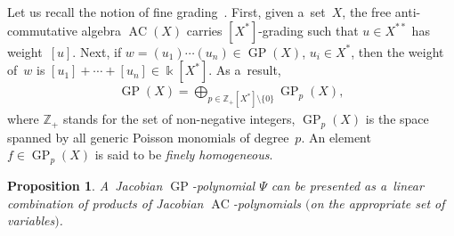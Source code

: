 \documentclass[11pt]{article}
\newtheorem{proposition}{Proposition}
\begin{document}
Let us recall the notion of f\/ine grading~\cite{FarkasI}.
First, given a~set~$X$, the free anti-commutative algebra $\operatorname{AC}(X)$ carries $[X^*]$-grading such that $u\in X^{**}$ has weight~$[u]$.
Next, if $w = (u_1)\cdots (u_n)\in \operatorname{GP}(X)$, $u_i\in X^{*}$, then the weight of~$w$ is $[u_1]+\cdots + [u_n]\in \Bbbk [X^*]$.
As a~result,
\begin{gather*}
\operatorname{GP}(X) = \bigoplus\limits_{p\in \mathbb Z_+ [X^*]\setminus \{0\}} \operatorname{GP}_p(X),
\end{gather*}
where $\mathbb Z_+$ stands for the set of non-negative integers, $\operatorname{GP}_p(X)$ is the space spanned by all generic Poisson
monomials of degree~$p$.
An element $f\in \operatorname{GP}_p(X)$ is said to be {\em finely homogeneous}.

\begin{proposition}
A~Jacobian $\operatorname{GP}$-polynomial $\Psi $ can be presented as a~linear combination of products of Jacobian $\operatorname{AC}$-polynomials $($on the
appropriate set of variables$)$.
\end{proposition}
\end{document}
